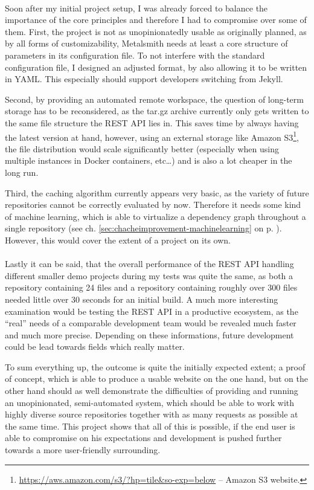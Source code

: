\paragraph{}
Soon after my initial project setup, I was already forced to balance the importance of the core principles and therefore I had to compromise over some of them. First, the project is not as unopinionatedly usable as originally planned, as by all forms of customizability, Metalsmith needs at least a core structure of parameters in its configuration file. To not interfere with the standard configuration file, I designed an adjusted format, by also allowing it to be written in YAML. This especially should support developers switching from Jekyll.

Second, by providing an automated remote workspace, the question of long-term storage has to be reconsidered, as the tar.gz archive currently only gets written to the same file structure the REST API lies in. This saves time by always having the latest version at hand, however, using an external storage like Amazon S3\footnote{\url{https://aws.amazon.com/s3/?hp=tile&so-exp=below} -- Amazon S3 website.}, the file distribution would scale significantly better (especially when using multiple instances in Docker containers, etc\ldots) and is also a lot cheaper in the long run.

Third, the caching algorithm currently appears very basic, as the variety of future repositories cannot be correctly evaluated by now. Therefore it needs some kind of machine learning, which is able to virtualize a dependency graph throughout a single repository (see ch. \ref{sec:chacheimprovement-machinelearning} on p. \pageref{sec:chacheimprovement-machinelearning}). However, this would cover the extent of a project on its own.

\paragraph{}
Lastly it can be said, that the overall performance of the REST API handling different smaller demo projects during my tests was quite the same, as both a repository containing 24 files and a repository containing roughly over 300 files needed little over 30 seconds for an initial build. A much more interesting examination would be testing the REST API in a productive ecosystem, as the ``real'' needs of a comparable development team would be revealed much faster and much more precise. Depending on these informations, future development could be lead towards fields which really matter.

To sum everything up, the outcome is quite the initially expected extent; a proof of concept, which is able to produce a usable website on the one hand, but on the other hand should as well demonstrate the difficulties of providing and running an unopinionated, semi-automated system, which should be able to work with highly diverse source repositories together with as many requests as possible at the same time. This project shows that all of this is possible, if the end user is able to compromise on his expectations and development is pushed further towards a more user-friendly surrounding.

